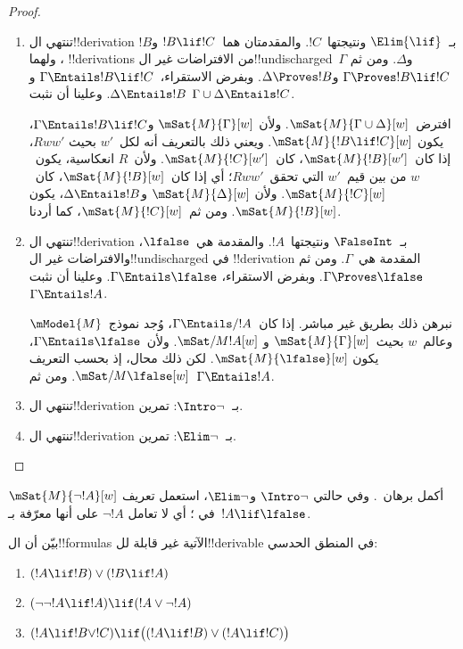 \documentclass[../../../include/open-logic-section]{subfiles}
\begin{document}
\begin{proof}
\begin{enumerate}
  \item تنتهي ال!!{derivation} بـ~$\Elim{\lif}$ ونتيجتها~$!C$.
    والمقدمتان هما~$!B \lif !C$ و$!B$، ولهما !!{derivation}s من
    الافتراضات غير ال!!{undischarged}~$\Gamma$ و$\Delta$. ومن ثم
    $\Gamma \Proves !B \lif !C$ و$\Delta \Proves !B$. وبفرض
    الاستقراء،~$\Gamma \Entails !B \lif !C$ و
    $\Delta \Entails !B$. وعلينا أن نثبت
    $\Gamma \cup \Delta \Entails !C$.

    افترض~$\mSat{M}{\Gamma \cup \Delta}[w]$. ولأن
    $\mSat{M}{\Gamma}[w]$ و$\Gamma \Entails !B \lif !C$، يكون
    $\mSat{M}{!B \lif !C}[w]$. ويعني ذلك بالتعريف أنه لكل~$w'$ بحيث
    $Rww'$، إذا كان~$\mSat{M}{!B}[w']$، كان~$\mSat{M}{!C}[w']$.
    ولأن~$R$ انعكاسية، يكون~$w$ من بين قيم~$w'$ التي تحقق~$Rww'$؛
    أي إذا كان~$\mSat{M}{!B}[w]$، كان~$\mSat{M}{!C}[w]$. ولأن
    $\mSat{M}{\Delta}[w]$ و$\Delta \Entails !B$، يكون
    $\mSat{M}{!B}[w]$. ومن ثم~$\mSat{M}{!C}[w]$، كما أردنا.

  \item تنتهي ال!!{derivation} بـ~$\FalseInt$ ونتيجتها~$!A$.
    والمقدمة هي~$\lfalse$، والافتراضات غير ال!!{undischarged} في
    !!{derivation} المقدمة هي~$\Gamma$. ومن ثم
    $\Gamma \Proves \lfalse$. وبفرض الاستقراء،
    $\Gamma \Entails \lfalse$. وعلينا أن نثبت
    $\Gamma \Entails !A$.

    نبرهن ذلك بطريق غير مباشر. إذا كان~$\Gamma \Entails/ !A$، وُجد
    نموذج~$\mModel{M}$ وعالم~$w$ بحيث~$\mSat{M}{\Gamma}[w]$ و
    $\mSat/{M}{!A}[w]$. ولأن~$\Gamma \Entails \lfalse$، يكون
    $\mSat{M}{\lfalse}[w]$. لكن ذلك محال، إذ بحسب التعريف
    $\mSat/{M}{\lfalse}[w]$. ومن ثم~$\Gamma \Entails !A$.
  \item تنتهي ال!!{derivation} بـ~$\Intro\lnot$: تمرين.
  \item تنتهي ال!!{derivation} بـ~$\Elim\lnot$: تمرين.
  \end{enumerate}
\end{proof}

\begin{prob}
  أكمل برهان~. وفي حالتي
  $\Intro\lnot$ و$\Elim\lnot$، استعمل تعريف
  $\mSat{M}{\lnot !A}[w]$ في
  ؛ أي لا تعامل
  $\lnot !A$ على أنها معرّفة بـ~$!A \lif \lfalse$.
\end{prob}

\begin{prob}
  بيّن أن ال!!{formula}s الآتية غير قابلة لل!!{derivable} في المنطق
  الحدسي:
  \begin{enumerate}
    \item $(!A \lif !B) \lor (!B \lif !A)$
    \item $(\lnot\lnot !A \lif !A) \lif (!A \lor \lnot !A)$
    \item $(!A \lif !B \lor !C) \lif \bigl((!A \lif !B)\lor(!A \lif !C)\bigr)$
  \end{enumerate}
\end{prob}
\end{document}
